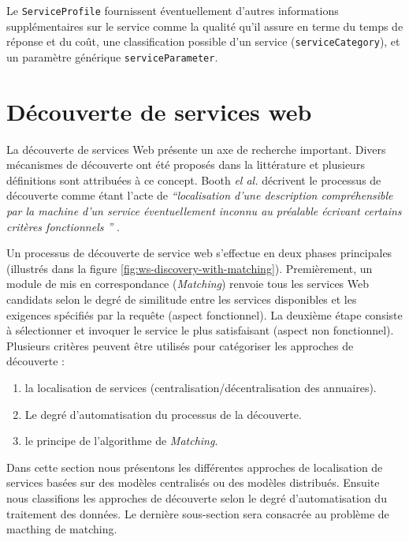     Le \verb|ServiceProfile| fournissent éventuellement d'autres
    informations supplémentaires sur le service comme la qualité qu'il
    assure en terme du temps de réponse et du coût, une classification
    possible d'un service (\verb|serviceCategory|), et un paramètre
    générique \verb|serviceParameter|.

\section{Découverte de services web}
\label{sec:ws-discovery}
La découverte de services Web présente un axe de recherche
important. Divers mécanismes de découverte ont été proposés dans la
littérature et plusieurs définitions sont attribuées à ce
concept. Booth \textit{el al.}  décrivent le processus de découverte
comme étant l'acte de \textit{``localisation d'une description
  compréhensible par la machine d'un service éventuellement inconnu au
  préalable écrivant certains critères fonctionnels ''}
\cite{booth2004web}.



Un processus de découverte de service web s'effectue en deux phases
principales (illustrés dans la figure
\ref{fig:ws-discovery-with-matching}). Premièrement, un module de mis
en correspondance (\textit{Matching}) renvoie tous les services Web
candidats selon le degré de similitude entre les services disponibles
et les exigences spécifiés par la requête (aspect fonctionnel). La
deuxième étape consiste à sélectionner et invoquer le service le plus
satisfaisant (aspect non fonctionnel). Plusieurs critères peuvent être
utilisés pour catégoriser les approches de découverte \cite{elie2010}:

\begin{enumerate}
\item la localisation de services (centralisation/décentralisation
  des annuaires).
\item Le degré d'automatisation du processus de la découverte.
\item le principe de l'algorithme de \textit{Matching}.
\end{enumerate}

Dans cette section nous présentons les différentes approches de
localisation de services basées sur des modèles centralisés ou des
modèles distribués. Ensuite nous classifions les approches de
découverte selon le degré d'automatisation du traitement des
données. Le dernière sous-section sera consacrée au problème de
macthing de matching.


